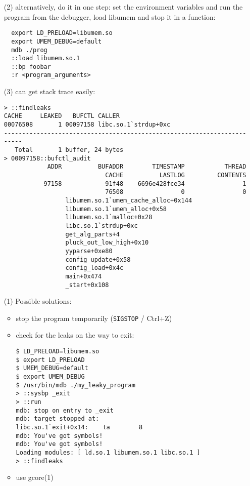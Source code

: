\begin{itemize}
  \item[(2)] alternatively, do it in one step: set the environment variables
      and run the program from the debugger, load libumem and stop it in
      a function:
\begin{verbatim}
  export LD_PRELOAD=libumem.so
  export UMEM_DEBUG=default
  mdb ./prog
  ::load libumem.so.1
  ::bp foobar
  :r <program_arguments>
\end{verbatim}
 \item[(3)] can get stack trace easily:
\begin{verbatim}
> ::findleaks
CACHE     LEAKED   BUFCTL CALLER
00076508       1 00097158 libc.so.1`strdup+0xc
------------------------------------------------------------------------
   Total       1 buffer, 24 bytes
> 00097158::bufctl_audit
            ADDR          BUFADDR        TIMESTAMP           THREAD
                            CACHE          LASTLOG         CONTENTS
           97158            91f48    6696e428fce34                1
                            76508                0                0
                 libumem.so.1`umem_cache_alloc+0x144
                 libumem.so.1`umem_alloc+0x58
                 libumem.so.1`malloc+0x28
                 libc.so.1`strdup+0xc
                 get_alg_parts+4
                 pluck_out_low_high+0x10
                 yyparse+0xe80
                 config_update+0x58
                 config_load+0x4c
                 main+0x474
                 _start+0x108
\end{verbatim}
  \item[(1)] Possible solutions:
  \begin{itemize}
    \item stop the program temporarily (\texttt{SIGSTOP} / Ctrl+Z)
    \item check for the leaks on the way to exit:

\begin{verbatim}
$ LD_PRELOAD=libumem.so
$ export LD_PRELOAD
$ UMEM_DEBUG=default
$ export UMEM_DEBUG
$ /usr/bin/mdb ./my_leaky_program
> ::sysbp _exit
> ::run
mdb: stop on entry to _exit
mdb: target stopped at:
libc.so.1`exit+0x14:    ta        8
mdb: You've got symbols!
mdb: You've got symbols!
Loading modules: [ ld.so.1 libumem.so.1 libc.so.1 ]
> ::findleaks
\end{verbatim}
    \item use gcore(1)
  \end{itemize}
\end{itemize}


